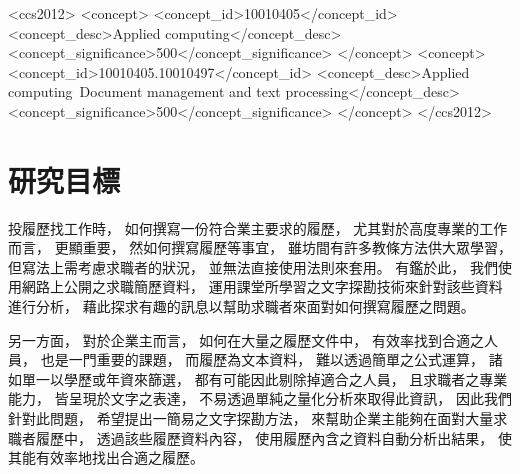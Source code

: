 \documentclass[sigconf]{acmart}
\begin{document}
\begin{CCSXML}
<ccs2012>
   <concept>
       <concept_id>10010405</concept_id>
       <concept_desc>Applied computing</concept_desc>
       <concept_significance>500</concept_significance>
       </concept>
   <concept>
       <concept_id>10010405.10010497</concept_id>
       <concept_desc>Applied computing~Document management and text processing</concept_desc>
       <concept_significance>500</concept_significance>
       </concept>
 </ccs2012>
\end{CCSXML}

\maketitle

\section{研究目標}

投履歷找工作時，
如何撰寫一份符合業主要求的履歷，
尤其對於高度專業的工作而言，
更顯重要，
然如何撰寫履歷等事宜，
雖坊間有許多教條方法供大眾學習，
但寫法上需考慮求職者的狀況，
並無法直接使用法則來套用。
有鑑於此，
我們使用網路上公開之求職簡歷資料，
運用課堂所學習之文字探勘技術來針對該些資料進行分析，
藉此探求有趣的訊息以幫助求職者來面對如何撰寫履歷之問題。

另一方面，
對於企業主而言，
如何在大量之履歷文件中，
有效率找到合適之人員，
也是一門重要的課題，
而履歷為文本資料，
難以透過簡單之公式運算，
諸如單一以學歷或年資來篩選，
都有可能因此剔除掉適合之人員，
且求職者之專業能力，
皆呈現於文字之表達，
不易透過單純之量化分析來取得此資訊，
因此我們針對此問題，
希望提出一簡易之文字探勘方法，
來幫助企業主能夠在面對大量求職者履歷中，
透過該些履歷資料內容，
使用履歷內含之資料自動分析出結果，
使其能有效率地找出合適之履歷。
\end{document}
